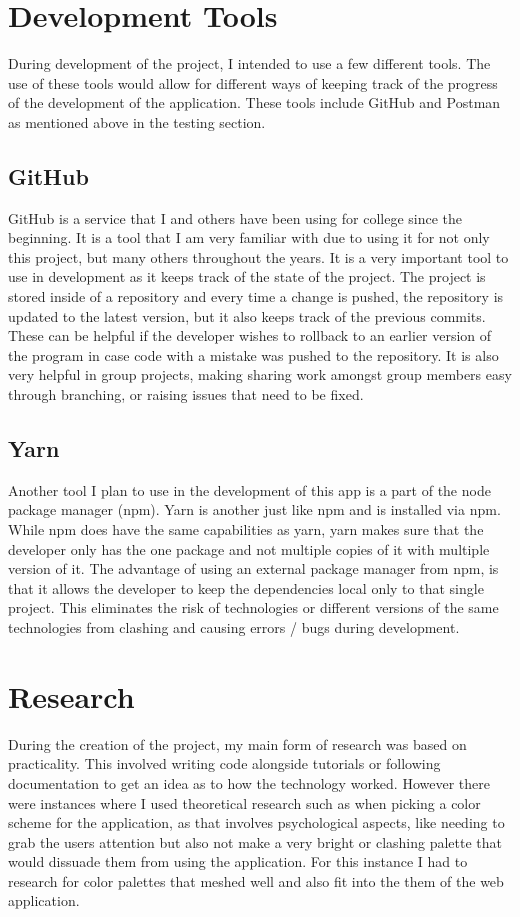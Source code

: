 \section{Development Tools}During development of the project, I intended to use a few different tools. The use of these tools would allow for different ways of keeping track of the progress of the development of the application. These tools include GitHub and Postman as mentioned above in the testing section.

\subsection{GitHub}GitHub is a service that I and others have been using for college since the beginning. It is a tool that I am very familiar with due to using it for not only this project, but many others throughout the years. It is a very important tool to use in development as it keeps track of the state of the project. The project is stored inside of a repository and every time a change is pushed, the repository is updated to the latest version, but it also keeps track of the previous commits. These can be helpful if the developer wishes to rollback to an earlier version of the program in case code with a mistake was pushed to the repository. It is also very helpful in group projects, making sharing work amongst group members easy through branching, or raising issues that need to be fixed.

\subsection{Yarn}Another tool I plan to use in the development of this app is a part of the node package manager (npm). Yarn is another just like npm and is installed via npm. While npm does have the same capabilities as yarn, yarn makes sure that the developer only has the one package and not multiple copies of it with multiple version of it. The advantage of using an external package manager from npm, is that it allows the developer to keep the dependencies local only to that single project. This eliminates the risk of technologies or different versions of the same technologies from clashing and causing errors / bugs during development.

\section{Research}During the creation of the project, my main form of research was based on practicality. This involved writing code alongside tutorials or following documentation to get an idea as to how the technology worked. However there were instances where I used theoretical research such as when picking a color scheme for the application, as that involves psychological aspects, like needing to grab the users attention but also not make a very bright or clashing palette that would dissuade them from using the application. For this instance I had to research for color palettes that meshed well and also fit into the them of the web application.

